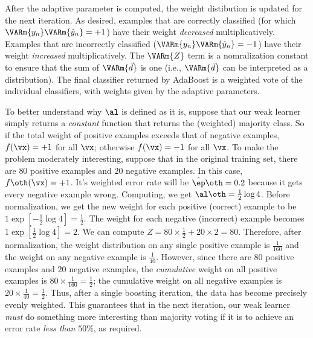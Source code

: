 After the adaptive parameter is computed, the weight distibution is
updated for the next iteration.  As desired, examples that are
correctly classified (for which $\VARm{y_n} \VARm{\hat y_n} = +1$)
have their weight \emph{decreased} multiplicatively.  Examples that
are incorrectly classified ($\VARm{y_n} \VARm{\hat y_n} = -1$) have
their weight \emph{increased} multiplicatively.  The $\VARm{Z}$ term
is a nomralization constant to ensure that the sum of $\VARm{\vec d}$
is one (i.e., $\VARm{\vec d}$ can be interpreted as a distribution).
The final classifier returned by AdaBoost is a weighted vote of the
individual classifiers, with weights given by the adaptive parameters.

To better understand why $\al$ is defined as it is, suppose that our
weak learner simply returns a \emph{constant} function that returns
the (weighted) majority class.  So if the total weight of positive
examples exceeds that of negative examples, $f(\vx) = +1$ for all
$\vx$; otherwise $f(\vx) = -1$ for all $\vx$.  To make the problem
moderately interesting, suppose that in the original training set,
there are $80$ positive examples and $20$ negative examples.  In this
case, $f\oth(\vx)=+1$.  It's weighted error rate will be $\hat\ep\oth
= 0.2$ because it gets every negative example wrong.  Computing, we
get $\al\oth = \frac12\log 4$.  Before normalization, we get the new
weight for each positive (correct) example to be $1 \exp[-\frac12\log
4] = \frac12$.  The weight for each negative (incorrect) example
becomes $1 \exp[\frac12\log 4] = 2$.  We can compute $Z = 80 \times
\frac 1 2 + 20 \times 2 = 80$.  Therefore, after normalization, the
weight distribution on any single positive example is $\frac 1 {160}$
and the weight on any negative example is $\frac 1 {40}$.  However,
since there are $80$ positive examples and $20$ negative examples, the
\emph{cumulative} weight on all positive examples is $80 \times \frac
1 {160} = \frac 1 2$; the cumulative weight on all negative examples
is $20 \times \frac 1{40} = \frac12$.  Thus, after a single boosting
iteration, the data has become precisely evenly weighted.  This
guarantees that in the next iteration, our weak learner \emph{must} do
something more interesting than majority voting if it is to achieve an
error rate \emph{less than} $50\%$, as required.



